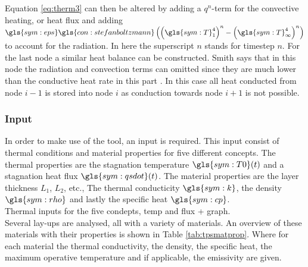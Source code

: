Equation \eqref{eq:therm3} can then be altered by adding a $q^n$-term for the convective heating, or heat flux and adding  $\gls{sym:eps}\gls{con:stefanboltzmann}\left(\left(\gls{sym:T}_1^4\right)^n-\left(\gls{sym:T}_\infty^4\right)^n\right)$ to account for the radiation. In here the superscript $n$ stands for timestep $n$. For the last node a similar heat balance can be constructed. Smith says that in this node the radiation and convection terms can omitted since they are much lower than the conductive heat rate in this part \cite{Smith2011}. In this case all heat conducted from node $i-1$ is stored into node $i$ as conduction towards node $i+1$ is not possible.


\subsubsection{Input}
In order to make use of the tool, an input is required. This input consist of thermal conditions and material properties for five different concepts. The thermal properties are the stagnation temperature $ \gls{sym:T0}(t) $ and a stagnation heat flux $ \gls{sym:qsdot}(t) $. The material properties are the layer thickness $ L_1 $, $ L_2 $, etc., The thermal conducticity $ \gls{sym:k} $, the density $ \gls{sym:rho} $ and lastly the specific heat $ \gls{sym:cp} $.\\

Thermal inputs for the five condepts, temp and flux + graph.\\

Several lay-ups are analysed, all with a variety of materials. An overview of these materials with their properties is shown in Table  \ref{tab:tpsmatprop}. Where for each material the thermal conductivity, the density, the specific heat, the maximum operative temperature and if applicable, the emissivity are given.


